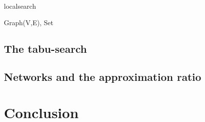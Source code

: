\documentclass [12pt]{article}
\begin{document}
    \begin {algorithm} [H]
        \caption {localsearch}
        \begin {algorithmic} [3]
        \Require Graph(V,E), Set
        \end {algorithmic}
    \end {algorithm}
    \subsection{The tabu-search}
    \subsection{Networks and the approximation ratio}
\section{Conclusion}


\end{document}
